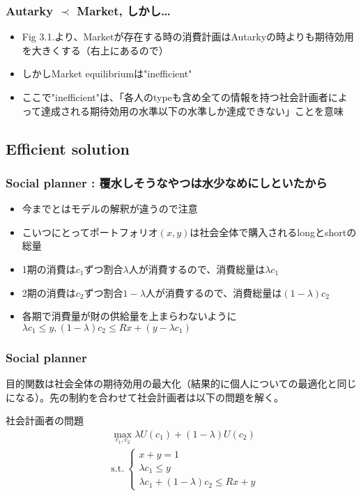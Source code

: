 \documentclass[dvipdfmx, 12pt]{beamer}
\begin{document}
\begin{frame}\frametitle{Autarky $\prec$ Market, しかし…}
	\begin{itemize}
		\item Fig 3.1.より、Marketが存在する時の消費計画はAutarkyの時よりも期待効用を大きくする（右上にあるので）
		\item しかしMarket equilibriumは"inefficient"
		\item ここで"inefficient"は、「各人のtypeも含め全ての情報を持つ社会計画者によって達成される期待効用の水準以下の水準しか達成できない」ことを意味
	\end{itemize}
\end{frame}

\subsection{Efficient solution}
\begin{frame}\frametitle{Social planner : \small 覆水しそうなやつは水少なめにしといたから}
	\begin{itemize}
		\item 今までとはモデルの解釈が違うので注意
		\item こいつにとってポートフォリオ$(x, y)$は社会全体で購入されるlongとshortの総量
		\item 1期の消費は$c_1$ずつ割合$\lambda$人が消費するので、消費総量は$\lambda c_1$
		\item 2期の消費は$c_2$ずつ割合$1-\lambda$人が消費するので、消費総量は$(1 - \lambda)c_2$
		\item 各期で消費量が財の供給量を上まらわないように$\lambda c_1 \leq y, (1 - \lambda)c_2 \leq Rx + (y - \lambda c_1)$
	\end{itemize}
\end{frame}
\begin{frame}\frametitle{Social planner}
	目的関数は社会全体の期待効用の最大化（結果的に個人についての最適化と同じになる）。先の制約を合わせて社会計画者は以下の問題を解く。
	\begin{itembox}[l]{社会計画者の問題}
	\begin{align*}
		&\max_{c_1, c_2} \lambda U(c_1) + (1 - \lambda) U(c_2) \\
		&\text{s.t.}\
    		\begin{cases}
                		x + y = 1 \\
                		\lambda c_1 \leq y \\
                		\lambda c_1 + (1-\lambda)c_2 \leq Rx + y
    		\end{cases}
	\end{align*}
	\end{itembox}
\end{frame}
\end{document}
